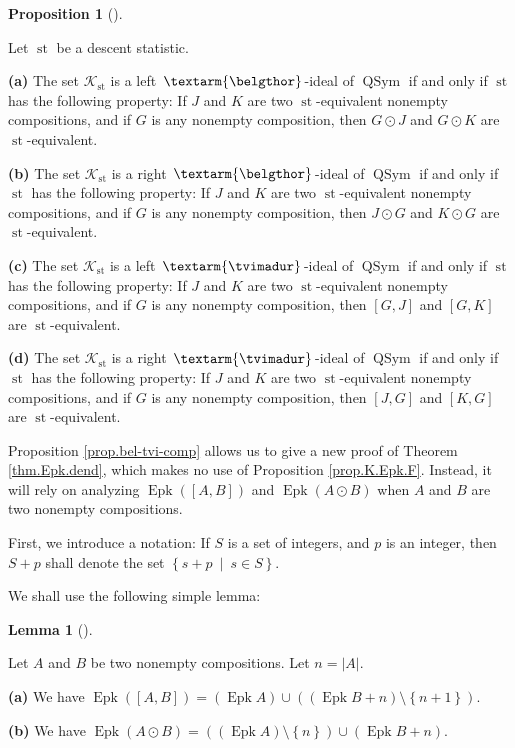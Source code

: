 \documentclass[numbers=enddot,12pt,final,onecolumn,notitlepage]{scrartcl}%
\theoremstyle{definition}
\newtheorem{lem}[theo]{Lemma}
\newenvironment{lemma}[1][]
{\begin{lem}[#1]\begin{leftbar}}
{\end{leftbar}\end{lem}}
\newtheorem{prop}[theo]{Proposition}
\newenvironment{proposition}[1][]
{\begin{prop}[#1]\begin{leftbar}}
{\end{leftbar}\end{prop}}
\newcommand{\tvi}{\left. \textarm{\tvimadur} \right.}
\newcommand{\bel}{\left. \textarm{\belgthor} \right.}
\begin{document}
\begin{proposition}
\label{prop.bel-tvi-comp}Let $\operatorname*{st}$ be a descent statistic.

\textbf{(a)} The set $\mathcal{K}_{\operatorname*{st}}$ is a left $\bel$-ideal
of $\operatorname*{QSym}$ if and only if $\operatorname*{st}$ has the
following property: If $J$ and $K$ are two $\operatorname*{st}$-equivalent
nonempty compositions, and if $G$ is any nonempty composition, then $G\odot J$
and $G\odot K$ are $\operatorname*{st}$-equivalent.

\textbf{(b)} The set $\mathcal{K}_{\operatorname*{st}}$ is a right
$\bel$-ideal of $\operatorname*{QSym}$ if and only if $\operatorname*{st}$ has
the following property: If $J$ and $K$ are two $\operatorname*{st}$-equivalent
nonempty compositions, and if $G$ is any nonempty composition, then $J\odot G$
and $K\odot G$ are $\operatorname*{st}$-equivalent.

\textbf{(c)} The set $\mathcal{K}_{\operatorname*{st}}$ is a left $\tvi$-ideal
of $\operatorname*{QSym}$ if and only if $\operatorname*{st}$ has the
following property: If $J$ and $K$ are two $\operatorname*{st}$-equivalent
nonempty compositions, and if $G$ is any nonempty composition, then $\left[
G,J\right]  $ and $\left[  G,K\right]  $ are $\operatorname*{st}$-equivalent.

\textbf{(d)} The set $\mathcal{K}_{\operatorname*{st}}$ is a right
$\tvi$-ideal of $\operatorname*{QSym}$ if and only if $\operatorname*{st}$ has
the following property: If $J$ and $K$ are two $\operatorname*{st}$-equivalent
nonempty compositions, and if $G$ is any nonempty composition, then $\left[
J,G\right]  $ and $\left[  K,G\right]  $ are $\operatorname*{st}$-equivalent.
\end{proposition}

Proposition \ref{prop.bel-tvi-comp} allows us to give a new proof of Theorem
\ref{thm.Epk.dend}, which makes no use of Proposition \ref{prop.K.Epk.F}.
Instead, it will rely on analyzing $\operatorname*{Epk}\left(  \left[
A,B\right]  \right)  $ and $\operatorname*{Epk}\left(  A\odot B\right)  $ when
$A$ and $B$ are two nonempty compositions.

First, we introduce a notation: If $S$ is a set of integers, and $p$ is an
integer, then $S+p$ shall denote the set $\left\{  s+p\ \mid\ s\in S\right\}
$.

We shall use the following simple lemma:

\begin{lemma}
\label{lem.Epk.AB}Let $A$ and $B$ be two nonempty compositions. Let
$n=\left\vert A\right\vert $.

\textbf{(a)} We have $\operatorname*{Epk}\left(  \left[  A,B\right]  \right)
=\left(  \operatorname*{Epk}A\right)  \cup\left(  \left(  \operatorname*{Epk}%
B+n\right)  \setminus\left\{  n+1\right\}  \right)  $.

\textbf{(b)} We have $\operatorname*{Epk}\left(  A\odot B\right)  =\left(
\left(  \operatorname*{Epk}A\right)  \setminus\left\{  n\right\}  \right)
\cup\left(  \operatorname*{Epk}B+n\right)  $.
\end{lemma}
\end{document}
